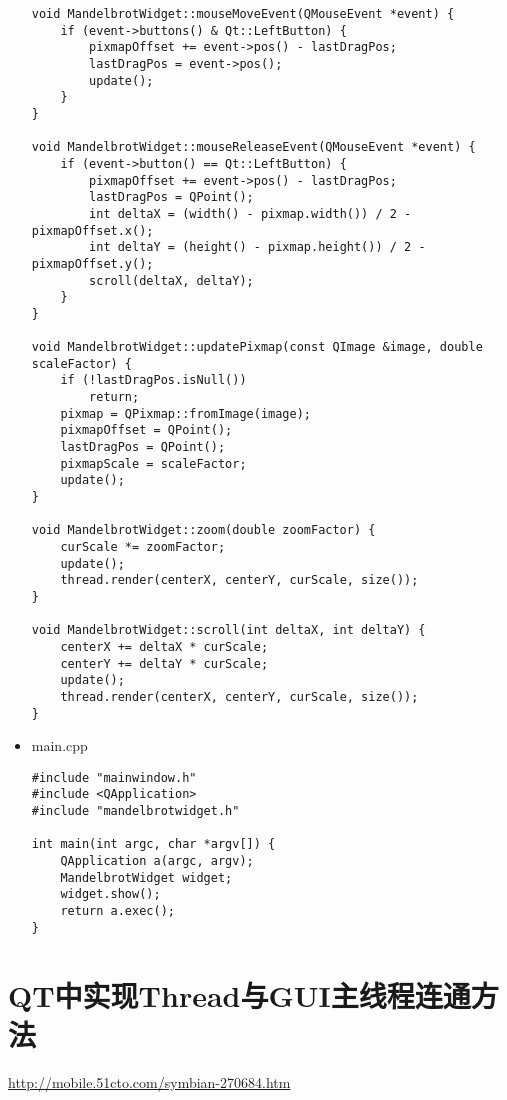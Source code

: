 \documentclass[9pt,b5paper]{article}
\begin{document}
\begin{itemize}
\begin{lstlisting}
void MandelbrotWidget::mouseMoveEvent(QMouseEvent *event) {
    if (event->buttons() & Qt::LeftButton) {
        pixmapOffset += event->pos() - lastDragPos;
        lastDragPos = event->pos();
        update();
    }
}

void MandelbrotWidget::mouseReleaseEvent(QMouseEvent *event) {
    if (event->button() == Qt::LeftButton) {
        pixmapOffset += event->pos() - lastDragPos;
        lastDragPos = QPoint();
        int deltaX = (width() - pixmap.width()) / 2 - pixmapOffset.x();
        int deltaY = (height() - pixmap.height()) / 2 - pixmapOffset.y();
        scroll(deltaX, deltaY);
    }
}

void MandelbrotWidget::updatePixmap(const QImage &image, double scaleFactor) {
    if (!lastDragPos.isNull()) 
        return;
    pixmap = QPixmap::fromImage(image);
    pixmapOffset = QPoint();
    lastDragPos = QPoint();
    pixmapScale = scaleFactor;
    update();
}

void MandelbrotWidget::zoom(double zoomFactor) {
    curScale *= zoomFactor;
    update();
    thread.render(centerX, centerY, curScale, size());
}

void MandelbrotWidget::scroll(int deltaX, int deltaY) {
    centerX += deltaX * curScale;
    centerY += deltaY * curScale;
    update();
    thread.render(centerX, centerY, curScale, size());
}
\end{lstlisting}

\item main.cpp
\lstset{language=java,label= ,caption= ,numbers=none}
\begin{lstlisting}
#include "mainwindow.h"
#include <QApplication>
#include "mandelbrotwidget.h"

int main(int argc, char *argv[]) {
    QApplication a(argc, argv);
    MandelbrotWidget widget;
    widget.show();
    return a.exec();
}
\end{lstlisting}
\end{itemize}

\section{QT中实现Thread与GUI主线程连通方法}
\label{sec-7}
\url{http://mobile.51cto.com/symbian-270684.htm}
\subsection{}
\label{sec-7-1}
\end{document}
